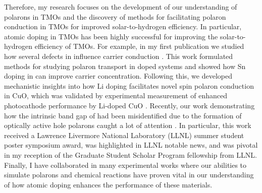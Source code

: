 Therefore, my research focuses on the development of our understanding of polarons in TMOs and the discovery of methods for facilitating polaron conduction in TMOs for improved solar-to-hydrogen efficiency. In particular, atomic doping in TMOs has been highly successful for improving the solar-to-hydrogen efficiency of TMOs. For example, in my first publication we studied how several defects in  influence carrier conduction \cite{smart2017effect}. This work formulated methods for studying polaron transport in doped systems and showed how Sn doping in  can improve carrier concentration. Following this, we developed mechanistic insights into how Li doping facilitates novel spin polaron conduction in CuO, which was validated by experimental measurement of enhanced photocathode performance by Li-doped CuO \cite{smart2018mechanistic}. Recently, our work demonstrating how the intrinsic band gap of  had been misidentified due to the formation of optically active hole polarons caught a lot of attention \cite{smart2019optical}. In particular, this work received a Lawrence Livermore National Laboratory (LLNL) summer student poster symposium award, was highlighted in LLNL notable news, and was pivotal in my reception of the Graduate Student Scholar Program fellowship from LLNL. Finally, I have collaborated in many experimental works where our abilities to simulate polarons \cite{wheeler2019combined,radmilovic2020combined} and chemical reactions \cite{lu2017,kou2018,kou2019,lu2019} have proven vital in our understanding of how atomic doping enhances the performance of these materials.
